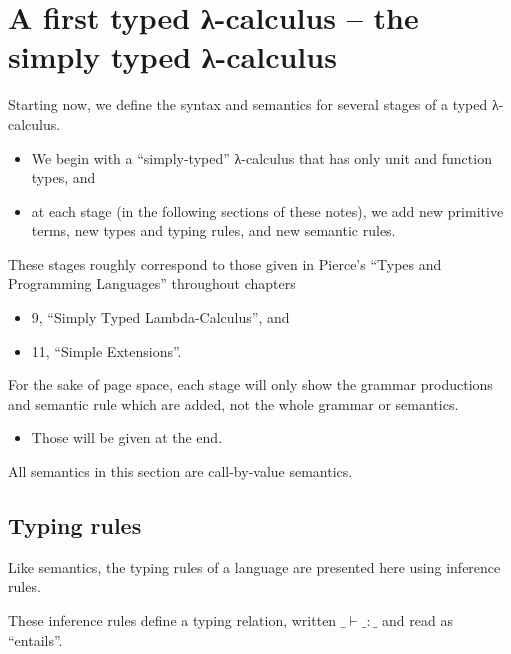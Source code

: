 \documentclass[11pt]{article}
\theoremstyle{definition}
\begin{document}
\section{A first typed λ-calculus – the simply typed λ-calculus}
\label{sec:org03a87bf}

Starting now, we define the syntax and semantics for several stages
of a typed λ-calculus.
\begin{itemize}
\item We begin with a “simply-typed” λ-calculus that has only
unit and function types, and
\item at each stage (in the following sections of these notes),
we add new primitive terms, new types
and typing rules, and new semantic rules.
\end{itemize}

These stages roughly correspond to those given in
Pierce's “Types and Programming Languages” throughout
chapters
\begin{itemize}
\item 9, “Simply Typed Lambda-Calculus”, and
\item 11, “Simple Extensions”.
\end{itemize}

For the sake of page space, each stage will only show
the grammar productions and semantic rule which are added,
not the whole grammar or semantics.
\begin{itemize}
\item Those will be given at the end.
\end{itemize}

All semantics in this section are call-by-value semantics.

\subsection{Typing rules}
\label{sec:org8d5ad05}

Like semantics, the typing rules of a language
are presented here using inference rules.

These inference rules define a typing relation,
written \(\_⊢\_:\_\) and read as “entails”.
\end{document}
